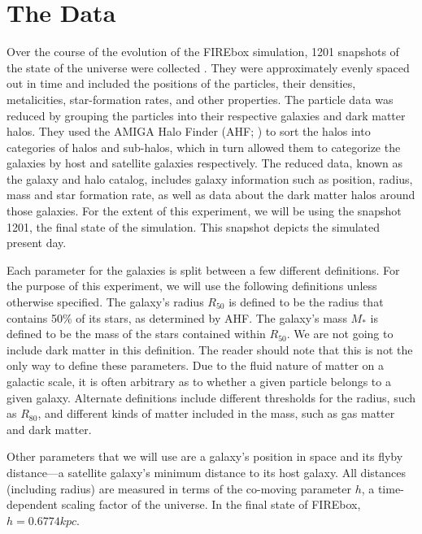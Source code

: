 
\section{The Data}
Over the course of the evolution of the FIREbox simulation, 1201 snapshots of the state of the universe were collected \citep{feldmannFIREboxSimulatingGalaxies2022}. They were approximately evenly spaced out in time and included the positions of the particles, their densities, metalicities, star-formation rates, and other properties. The particle data was reduced by grouping the particles into their respective galaxies and dark matter halos. They used the AMIGA Halo Finder (AHF; \cite{knollmannAhfAMIGAHALO2009}) to sort the halos into categories of halos and sub-halos, which in turn allowed them to categorize the galaxies by host and satellite galaxies respectively. The reduced data, known as the galaxy and halo catalog, includes galaxy information such as position, radius, mass and star formation rate, as well as data about the dark matter halos around those galaxies. For the extent of this experiment, we will be using the snapshot 1201, the final state of the simulation. This snapshot depicts the simulated present day.

Each parameter for the galaxies is split between a few different definitions. For the purpose of this experiment, we will use the following definitions unless otherwise specified. The galaxy's radius $R_{50}$ is defined to be the radius that contains 50\% of its stars, as determined by AHF. The galaxy's mass $M_*$ is defined to be the mass of the stars contained within $R_{50}$. We are not going to include dark matter in this definition. The reader should note that this is not the only way to define these parameters. Due to the fluid nature of matter on a galactic scale, it is often arbitrary as to whether a given particle belongs to a given galaxy. Alternate definitions include different thresholds for the radius, such as $R_{80}$, and different kinds of matter included in the mass, such as gas matter and dark matter.

Other parameters that we will use are a galaxy's position in space and its flyby distance---a satellite galaxy's minimum distance to its host galaxy. All distances (including radius) are measured in terms of the co-moving parameter $h$, a time-dependent scaling factor of the universe. In the final state of FIREbox, $h = 0.6774 kpc$. 

